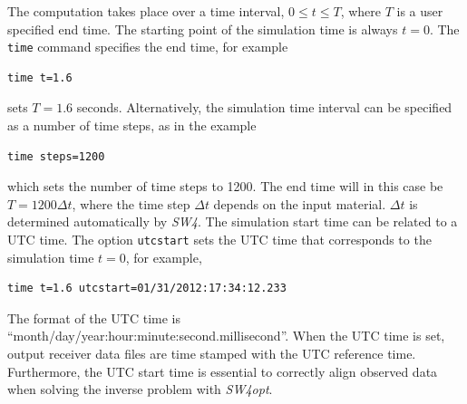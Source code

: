 \documentclass[11pt]{report}
\begin{document}
The computation takes place over a time interval, $0\leq t \leq T$, where $T$ is a user specified end time.
The starting point of the simulation time is always $t=0$. The {\tt time} command specifies the end time, for example
\begin{verbatim}
time t=1.6
\end{verbatim}
sets $T=1.6$ seconds. Alternatively, the simulation time interval can be specified as 
a number of time steps, as in the example
\begin{verbatim}
time steps=1200
\end{verbatim}
which sets the number of time steps to 1200. The end time will in this case be $T=1200\Delta t$, where the
time step $\Delta t$ depends on the input material. $\Delta t$ is determined automatically by \emph{SW4}.
The simulation start time can be related to a UTC time. The option {\tt utcstart} sets the UTC time that
corresponds to the simulation time $t=0$, for example,
\begin{verbatim}
time t=1.6 utcstart=01/31/2012:17:34:12.233
\end{verbatim}
The format of the UTC time is ``month/day/year:hour:minute:second.millisecond''. When the UTC time is set,
output receiver data files are time stamped with the UTC reference time. Furthermore, the UTC start time
is essential to correctly align observed data when solving the inverse problem with \emph{SW4opt}.
\end{document}
